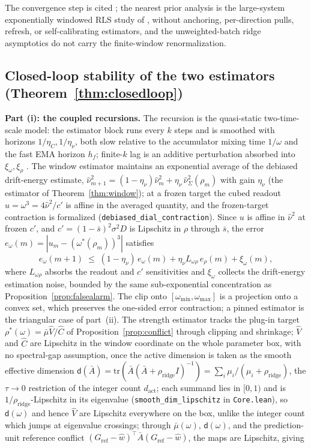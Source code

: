 The convergence step is cited \citep{silverstein1995,rubio2011,hachem2007}; the nearest prior analysis is the large-system exponentially windowed RLS study of \citet{xiao2005}, without anchoring, per-direction pulls, refresh, or self-calibrating estimators, and the unweighted-batch ridge asymptotics \citep{hastie2022,pafka2004} do not carry the finite-window renormalization.

\subsection{Closed-loop stability of the two estimators (Theorem~\ref{thm:closedloop})}

\textbf{Part (i): the coupled recursions.}
The recursion is the quasi-static two-time-scale model: the estimator block runs every $k$ steps and is smoothed with horizons $1/\eta_C, 1/\eta_\nu$, both slow relative to the accumulator mixing time $1/\omega$ and the fast EMA horizon $h_f$; finite-$k$ lag is an additive perturbation absorbed into $\xi_\omega, \xi_\rho$ \citep{borkar2008,benveniste1990,kushner2003}.
The window estimator maintains an exponential average of the debiased drift-energy estimate, $\widehat\nu^2_{m+1} = (1-\eta_\nu)\widehat\nu^2_m + \eta_\nu\,\widehat\nu^2_\Sigma(\rho_m)$ with gain $\eta_\nu$ (the estimator of Theorem~\ref{thm:window}); at a frozen target the cubed readout $u = \omega^3 = 4\widehat\nu^2/c'$ is affine in the averaged quantity, and the frozen-target contraction is formalized (\texttt{debiased\_dial\_contraction}).
Since $u$ is affine in $\widehat\nu^2$ at frozen $c'$, and $c' = (1-\bar s)^2\sigma^2D$ is Lipschitz in $\rho$ through $\bar s$, the error $e_\omega(m) = |u_m - (\omega^*(\rho_m))^3|$ satisfies
\[
e_\omega(m{+}1) \;\le\; (1-\eta_\nu)\,e_\omega(m) + \eta_\nu L_{\omega\rho}\, e_\rho(m) + \xi_\omega(m),
\]
where $L_{\omega\rho}$ absorbs the readout and $c'$ sensitivities and $\xi_\omega$ collects the drift-energy estimation noise, bounded by the same sub-exponential concentration as Proposition~\ref{prop:falsealarm}.
The clip onto $[\omega_{\min}, \omega_{\max}]$ is a projection onto a convex set, which preserves the one-sided error contraction; a pinned estimator is the triangular case of part~(ii).
The strength estimator tracks the plug-in target $\rho^*(\omega) = \bar\mu\widehat V/\widehat C$ of Proposition~\ref{prop:conflict} through clipping and shrinkage; $\widehat V$ and $\widehat C$ are Lipschitz in the window coordinate on the whole parameter box, with no spectral-gap assumption, once the active dimension is taken as the smooth effective dimension $\mathsf d(\bar A) = \mathrm{tr}(\bar A(\bar A+\rho_{\mathrm{ridge}}I)^{-1}) = \sum_i \mu_i/(\mu_i+\rho_{\mathrm{ridge}})$, the $\tau \to 0$ restriction of the integer count $d_{\mathrm{act}}$; each summand lies in $[0,1)$ and is $1/\rho_{\mathrm{ridge}}$-Lipschitz in its eigenvalue (\texttt{smooth\_dim\_lipschitz} in \texttt{Core.lean}), so $\mathsf d(\omega)$ and hence $\widehat V$ are Lipschitz everywhere on the box, unlike the integer count which jumps at eigenvalue crossings; through $\bar\mu(\omega)$, $\mathsf d(\omega)$, and the prediction-unit reference conflict $(G_{\mathrm{ref}}-\widehat w)^\top\bar A(G_{\mathrm{ref}}-\widehat w)$, the maps are Lipschitz, giving
